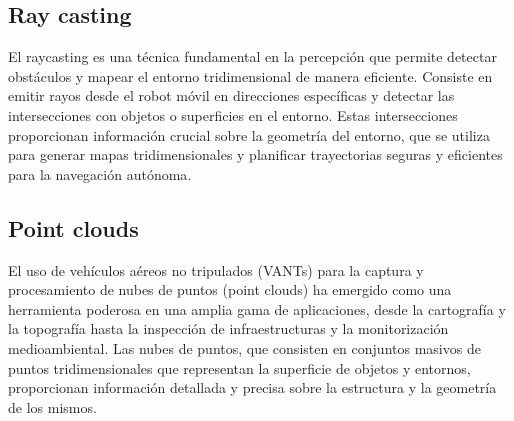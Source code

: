 \subsection{Ray casting}

El raycasting es una técnica fundamental en la percepción que permite detectar obstáculos y mapear el entorno tridimensional de manera eficiente. Consiste en emitir rayos desde el robot móvil en direcciones específicas y detectar las intersecciones con objetos o superficies en el entorno. Estas intersecciones proporcionan información crucial sobre la geometría del entorno, que se utiliza para generar mapas tridimensionales y planificar trayectorias seguras y eficientes para la navegación autónoma.


\subsection{Point clouds}

El uso de vehículos aéreos no tripulados (VANTs) para la captura y procesamiento de nubes de puntos (point clouds) ha emergido como una herramienta poderosa en una amplia gama de aplicaciones, desde la cartografía y la topografía hasta la inspección de infraestructuras y la monitorización medioambiental. Las nubes de puntos, que consisten en conjuntos masivos de puntos tridimensionales que representan la superficie de objetos y entornos, proporcionan información detallada y precisa sobre la estructura y la geometría de los mismos.






